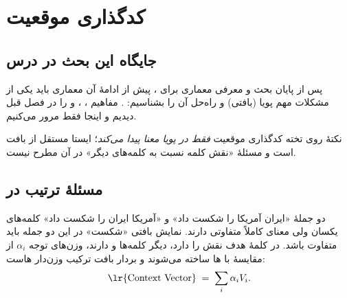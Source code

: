 \chapter{کدگذاری موقعیت}

\section{جایگاه این بحث در درس}
پس از پایان بحث  و معرفی معماری  برای ، پیش از ادامهٔ آن معماری باید یکی از مشکلات مهم  پویا (بافتی) و راه‌حل آن را بشناسیم: . مفاهیم ، ،  و  را در فصل قبل دیدیم و اینجا فقط مرور می‌کنیم.

\begin{exambox}{نکتهٔ روی تخته}
کدگذاری موقعیت \emph{فقط در  پویا معنا پیدا می‌کند}؛  ایستا مستقل از بافت است و مسئلهٔ «نقش کلمه نسبت به کلمه‌های دیگر» در آن مطرح نیست.
\end{exambox}

\section{مسئلهٔ ترتیب در }

دو جملهٔ «ایران آمریکا را شکست داد» و «آمریکا ایران را شکست داد» کلمه‌های یکسان ولی معنای کاملاً متفاوتی دارند. نمایش بافتی «شکست» در این دو جمله باید متفاوت باشد. در  کلمهٔ هدف نقش  را دارد، دیگر کلمه‌ها  و  دارند، وزن‌های توجه $\alpha_i$ از مقایسهٔ  با ها ساخته می‌شوند و بردار بافت ترکیب وزن‌دار هاست:
\[
\text{\lr{Context Vector}} \;=\; \sum_i \alpha_i V_i .
\]

